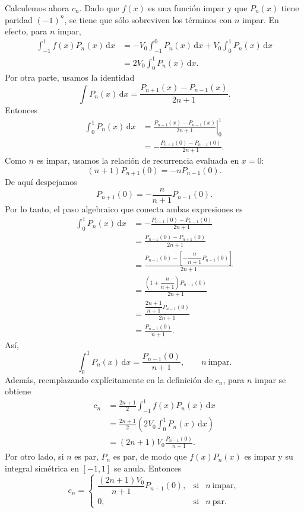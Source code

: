 \documentclass[11pt]{article}
\newcommand{\dd}{\,\mathrm{d}}
\begin{document}
Calculemos ahora $c_n$. Dado que $f(x)$ es una función impar y que $P_n(x)$ tiene paridad $(-1)^n$, se tiene que sólo sobreviven los términos con $n$ impar. En efecto, para $n$ impar,
\begin{align*}
\int_{-1}^{1}f(x)P_n(x)\dd x
&=-V_0\int_{-1}^{0}P_n(x)\dd x+V_0\int_{0}^{1}P_n(x)\dd x\\
&=2V_0\int_0^1P_n(x)\dd x.
\end{align*}
Por otra parte, usamos la identidad
\begin{equation}
\label{integral-pn-identidad}
\int P_n(x)\dd x=\frac{P_{n+1}(x)-P_{n-1}(x)}{2n+1}.
\end{equation}
Entonces
\begin{align*}
\int_0^1P_n(x)\dd x
&=\left.\frac{P_{n+1}(x)-P_{n-1}(x)}{2n+1}\right|_0^1\\
&=-\frac{P_{n+1}(0)-P_{n-1}(0)}{2n+1}.
\end{align*}
Como $n$ es impar, usamos la relación de recurrencia evaluada en $x=0$:
\begin{equation*}
(n+1)P_{n+1}(0)=-nP_{n-1}(0).
\end{equation*}
De aquí despejamos
\begin{equation*}
P_{n+1}(0)=-\frac{n}{n+1}P_{n-1}(0).
\end{equation*}
Por lo tanto, el paso algebraico que conecta ambas expresiones es
\begin{align*}
\int_0^1P_n(x)\dd x
&=-\frac{P_{n+1}(0)-P_{n-1}(0)}{2n+1}\\[0.3em]
&=\frac{P_{n-1}(0)-P_{n+1}(0)}{2n+1}\\[0.3em]
&=\frac{P_{n-1}(0)-\left[-\dfrac{n}{n+1}P_{n-1}(0)\right]}{2n+1}\\[0.3em]
&=\frac{\left(1+\dfrac{n}{n+1}\right)P_{n-1}(0)}{2n+1}\\[0.3em]
&=\frac{\dfrac{2n+1}{n+1}P_{n-1}(0)}{2n+1}\\[0.3em]
&=\frac{P_{n-1}(0)}{n+1}.
\end{align*}
Así,
\begin{equation}
\label{integral-0-1-pn-impar}
\int_0^1P_n(x)\dd x=\frac{P_{n-1}(0)}{n+1},
\qquad n\ \text{impar}.
\end{equation}
Además, reemplazando explícitamente en la definición de $c_n$, para $n$ impar se obtiene
\begin{align*}
c_n
&=\frac{2n+1}{2}\int_{-1}^{1}f(x)P_n(x)\dd x\\
&=\frac{2n+1}{2}\left(2V_0\int_0^1P_n(x)\dd x\right)\\
&=(2n+1)V_0\frac{P_{n-1}(0)}{n+1}.
\end{align*}
Por otro lado, si $n$ es par, $P_n$ es par, de modo que $f(x)P_n(x)$ es impar y su integral simétrica en $[-1,1]$ se anula. Entonces
\begin{equation}
\label{coeficiente-cn-final-hemisferios}
c_n=
\left\{
\begin{array}{lcc}
\dfrac{(2n+1)V_0}{n+1}P_{n-1}(0), & \text{si} & n\ \text{impar},\\[0.8em]
0, & \text{si} & n\ \text{par}.
\end{array}
\right.
\end{equation}
\end{document}
